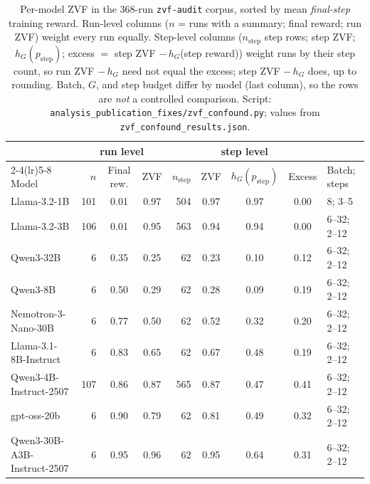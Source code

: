 \begin{table}[t]
\centering
\small
\caption{Per-model ZVF in the 368-run \texttt{zvf-audit} corpus, sorted by
mean \emph{final-step} training reward. Run-level columns ($n$ = runs with a
summary; final reward; run ZVF) weight every run equally. Step-level columns
($n_{\mathrm{step}}$ step rows; step ZVF; $h_G(p_{\mathrm{step}})$; excess $=$
step ZVF $-\,h_G$(step reward)) weight runs by their step count, so
run ZVF $-\,h_G$ need not equal the excess; step ZVF $-\,h_G$ does, up to
rounding. Batch, $G$, and step budget differ by model (last column), so the
rows are \emph{not} a controlled comparison. Script:
\texttt{analysis\_publication\_fixes/zvf\_confound.py}; values from
\texttt{zvf\_confound\_results.json}.}
\label{tab:p7-ushape}
\setlength{\tabcolsep}{4pt}
\begin{tabular}{lrccrcccl}
\toprule
 & \multicolumn{3}{c}{run level} & \multicolumn{4}{c}{step level} & \\
\cmidrule(lr){2-4}\cmidrule(lr){5-8}
Model & $n$ & Final rew. & ZVF & $n_{\mathrm{step}}$ & ZVF & $h_G(p_{\mathrm{step}})$ & Excess & Batch; steps \\
\midrule
Llama-3.2-1B             & 101 & 0.01 & 0.97 & 504 & 0.97 & 0.97 & 0.00 & 8; 3--5 \\
Llama-3.2-3B             & 106 & 0.01 & 0.95 & 563 & 0.94 & 0.94 & 0.00 & 6--32; 2--12 \\
Qwen3-32B                &   6 & 0.35 & 0.25 &  62 & 0.23 & 0.10 & 0.12 & 6--32; 2--12 \\
Qwen3-8B                 &   6 & 0.50 & 0.29 &  62 & 0.28 & 0.09 & 0.19 & 6--32; 2--12 \\
Nemotron-3-Nano-30B      &   6 & 0.77 & 0.50 &  62 & 0.52 & 0.32 & 0.20 & 6--32; 2--12 \\
Llama-3.1-8B-Instruct    &   6 & 0.83 & 0.65 &  62 & 0.67 & 0.48 & 0.19 & 6--32; 2--12 \\
Qwen3-4B-Instruct-2507   & 107 & 0.86 & 0.87 & 565 & 0.87 & 0.47 & 0.41 & 6--32; 2--12 \\
gpt-oss-20b              &   6 & 0.90 & 0.79 &  62 & 0.81 & 0.49 & 0.32 & 6--32; 2--12 \\
Qwen3-30B-A3B-Instruct-2507 & 6 & 0.95 & 0.96 & 62 & 0.95 & 0.64 & 0.31 & 6--32; 2--12 \\
\bottomrule
\end{tabular}
\end{table}

